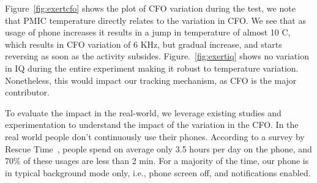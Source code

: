 Figure~\ref{fig:exertcfo} shows the plot of CFO variation during the test, we note that PMIC temperature directly relates to the variation in CFO. 
%
We see that as usage of phone increases it results in a jump in temperature of almost 10 \textdegree C, which results in CFO variation of 6 KHz, but gradual increase, and starts reversing as soon as the activity subsides. Figure.~\ref{fig:exertiq} shows no variation in IQ during the entire experiment making it robust to temperature variation. 
%
Nonetheless, this would impact our tracking mechanism, as CFO is the major contributor.%


To evaluate the impact in the real-world, we leverage existing studies and experimentation to understand the impact of the variation in the CFO. In the real world people don't continuously use their phones.
%
According to a survey by Rescue Time~\cite{mobileusage}, people spend on average only 3.5 hours per day on the phone, and 70\% of these usages are less than 2 min. 
%
For a majority of the time, our phone is in typical background mode only, i.e., phone screen off, and notifications enabled.
%

